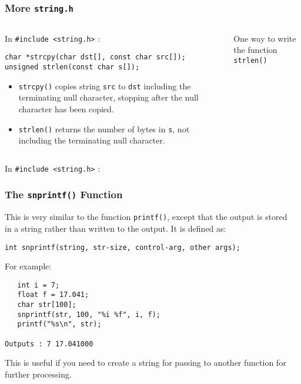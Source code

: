 \begin{frame}[fragile]
\frametitle{More {\tt string.h}}
\begin{columns}

\begin{column}{0.45\textwidth}
In \verb^#include <string.h>^ :
{\small
\begin{verbatim}
char *strcpy(char dst[], const char src[]);
unsigned strlen(const char s[]);
\end{verbatim}
}
\begin{itemize}[<+->]
\item \verb^strcpy()^ copies string \verb^src^ to \verb^dst^
including the  terminating null  character,
stopping after the null character has been copied.
\item \verb^strlen()^ returns the number of bytes in \verb^s^,
not including the terminating null character.
\end{itemize}
\end{column}

\pause
\begin{column}{0.45\textwidth}
One way to write the function \verb^strlen()^

\end{column}

\end{columns}
\end{frame}


\begin{frame}[fragile]
\begin{columns}

\begin{column}{0.45\textwidth}
In \verb^#include <string.h>^ :
\frametitle{The {\tt snprintf()} Function}
This is very similar to the function \verb^printf()^, except
that the output is stored in a string rather than written
to the output.
It is defined as:
\vspace{-0.75em}
{\small
\begin{verbatim}
int snprintf(string, str-size, control-arg, other args);
\end{verbatim}
}
\vspace{-0.75em}
For example:
\vspace{-0.75em}
\begin{verbatim}
   int i = 7;
   float f = 17.041;
   char str[100];
   snprintf(str, 100, "%i %f", i, f);
   printf("%s\n", str);

Outputs : 7 17.041000
\end{verbatim}
\vspace{-0.75em}
This is useful if you need to create a string for passing
to another function for further processing.
\end{column}

\pause
\begin{column}{0.45\textwidth}

\end{column}

\end{columns}
\end{frame}

